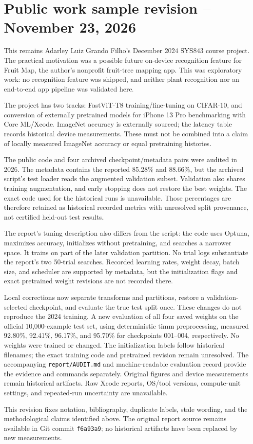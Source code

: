\section*{Public work sample revision -- November 23, 2026}
\begin{singlespace}
This remains Adarley Luiz Grando Filho's December 2024 SYS843 course project. The practical motivation was a possible future on-device recognition feature for Fruit Map, the author's nonprofit fruit-tree mapping app. This was exploratory work: no recognition feature was shipped, and neither plant recognition nor an end-to-end app pipeline was validated here.

The project has two tracks: FastViT-T8 training/fine-tuning on CIFAR-10, and conversion of externally pretrained models for iPhone 13 Pro benchmarking with Core ML/Xcode. ImageNet accuracy is externally sourced; the latency table records historical device measurements. These must not be combined into a claim of locally measured ImageNet accuracy or equal pretraining histories.

The public code and four archived checkpoint/metadata pairs were audited in 2026. The metadata contains the reported 85.28\% and 88.66\%, but the archived script's test loader reads the augmented validation subset. Validation also shares training augmentation, and early stopping does not restore the best weights. The exact code used for the historical runs is unavailable. Those percentages are therefore retained as historical recorded metrics with unresolved split provenance, not certified held-out test results.

The report's tuning description also differs from the script: the code uses Optuna, maximizes accuracy, initializes without pretraining, and searches a narrower space. It trains on part of the later validation partition. No trial logs substantiate the report's two 50-trial searches. Recorded learning rates, weight decay, batch size, and scheduler are supported by metadata, but the initialization flags and exact pretrained weight revisions are not recorded there.

Local corrections now separate transforms and partitions, restore a validation-selected checkpoint, and evaluate the true test split once. These changes do not reproduce the 2024 training. A new evaluation of all four saved weights on the official 10,000-example test set, using deterministic timm preprocessing, measured 92.80\%, 92.41\%, 96.17\%, and 95.70\% for checkpoints 001--004, respectively. No weights were trained or changed. The initialization labels follow historical filenames; the exact training code and pretrained revision remain unresolved. The accompanying \texttt{report/AUDIT.md} and machine-readable evaluation record provide the evidence and commands separately. Original figures and device measurements remain historical artifacts. Raw Xcode reports, OS/tool versions, compute-unit settings, and repeated-run uncertainty are unavailable.

This revision fixes notation, bibliography, duplicate labels, stale wording, and the methodological claims identified above. The original report source remains available in Git commit \texttt{f6a93a9}; no historical artifacts have been replaced by new measurements.
\end{singlespace}
